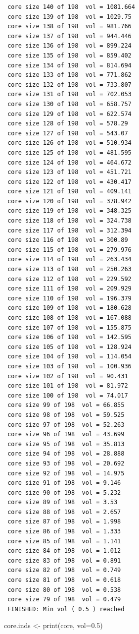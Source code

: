 \documentclass[
  letterpaper,
  DIV=11,
  numbers=noendperiod]{scrartcl}
\newenvironment{Shaded}{\begin{snugshade}}{\end{snugshade}}
\newcommand{\AttributeTok}[1]{\textcolor[rgb]{0.40,0.45,0.13}{#1}}
\newcommand{\FloatTok}[1]{\textcolor[rgb]{0.68,0.00,0.00}{#1}}
\newcommand{\FunctionTok}[1]{\textcolor[rgb]{0.28,0.35,0.67}{#1}}
\newcommand{\NormalTok}[1]{\textcolor[rgb]{0.00,0.23,0.31}{#1}}
\newcommand{\OtherTok}[1]{\textcolor[rgb]{0.00,0.23,0.31}{#1}}
\begin{document}
\begin{verbatim}
 core size 140 of 198  vol = 1081.664 
 core size 139 of 198  vol = 1029.75 
 core size 138 of 198  vol = 981.766 
 core size 137 of 198  vol = 944.446 
 core size 136 of 198  vol = 899.224 
 core size 135 of 198  vol = 859.402 
 core size 134 of 198  vol = 814.694 
 core size 133 of 198  vol = 771.862 
 core size 132 of 198  vol = 733.807 
 core size 131 of 198  vol = 702.053 
 core size 130 of 198  vol = 658.757 
 core size 129 of 198  vol = 622.574 
 core size 128 of 198  vol = 578.29 
 core size 127 of 198  vol = 543.07 
 core size 126 of 198  vol = 510.934 
 core size 125 of 198  vol = 481.595 
 core size 124 of 198  vol = 464.672 
 core size 123 of 198  vol = 451.721 
 core size 122 of 198  vol = 430.417 
 core size 121 of 198  vol = 409.141 
 core size 120 of 198  vol = 378.942 
 core size 119 of 198  vol = 348.325 
 core size 118 of 198  vol = 324.738 
 core size 117 of 198  vol = 312.394 
 core size 116 of 198  vol = 300.89 
 core size 115 of 198  vol = 279.976 
 core size 114 of 198  vol = 263.434 
 core size 113 of 198  vol = 250.263 
 core size 112 of 198  vol = 229.592 
 core size 111 of 198  vol = 209.929 
 core size 110 of 198  vol = 196.379 
 core size 109 of 198  vol = 180.628 
 core size 108 of 198  vol = 167.088 
 core size 107 of 198  vol = 155.875 
 core size 106 of 198  vol = 142.595 
 core size 105 of 198  vol = 128.924 
 core size 104 of 198  vol = 114.054 
 core size 103 of 198  vol = 100.936 
 core size 102 of 198  vol = 90.431 
 core size 101 of 198  vol = 81.972 
 core size 100 of 198  vol = 74.017 
 core size 99 of 198  vol = 66.855 
 core size 98 of 198  vol = 59.525 
 core size 97 of 198  vol = 52.263 
 core size 96 of 198  vol = 43.699 
 core size 95 of 198  vol = 35.813 
 core size 94 of 198  vol = 28.888 
 core size 93 of 198  vol = 20.692 
 core size 92 of 198  vol = 14.975 
 core size 91 of 198  vol = 9.146 
 core size 90 of 198  vol = 5.232 
 core size 89 of 198  vol = 3.53 
 core size 88 of 198  vol = 2.657 
 core size 87 of 198  vol = 1.998 
 core size 86 of 198  vol = 1.333 
 core size 85 of 198  vol = 1.141 
 core size 84 of 198  vol = 1.012 
 core size 83 of 198  vol = 0.891 
 core size 82 of 198  vol = 0.749 
 core size 81 of 198  vol = 0.618 
 core size 80 of 198  vol = 0.538 
 core size 79 of 198  vol = 0.479 
 FINISHED: Min vol ( 0.5 ) reached
\end{verbatim}

\begin{Shaded}
\begin{Highlighting}[]
\NormalTok{core.inds }\OtherTok{\textless{}{-}} \FunctionTok{print}\NormalTok{(core, }\AttributeTok{vol=}\FloatTok{0.5}\NormalTok{)}
\end{Highlighting}
\end{Shaded}
\end{document}
